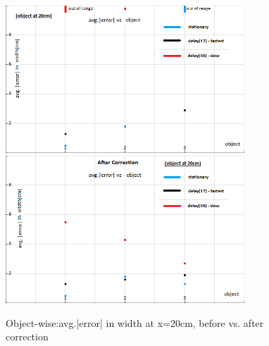 	\begin{figure}[H]
		\vfill
		\centering
		\includegraphics[width=0.8\textwidth]{../Files/savew1}\\
		
		\includegraphics[width=0.8\textwidth]{../Files/savew2}
		\caption{Object-wise:avg.|error| in width at x=20cm, before vs. after correction}  
	\end{figure}
